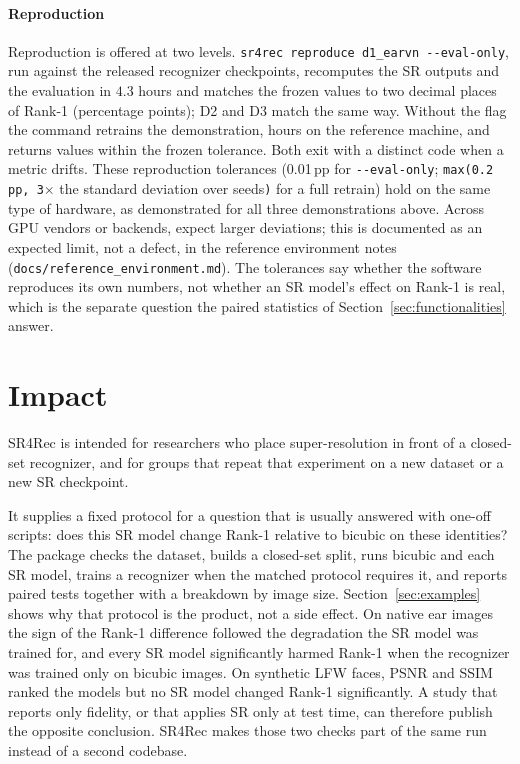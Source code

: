 \documentclass[preprint,12pt]{elsarticle}
\newcommand{\generated}[3]{}
\begin{document}
\generated{tab_latency.tex}{CPU latency, from scripts/make\_paper\_assets.py}{tab:latency}

\paragraph{Reproduction} Reproduction is offered at two levels. \texttt{sr4rec reproduce d1\_earvn
-{}-eval-only}, run against the released recognizer checkpoints, recomputes the SR outputs and the
evaluation in $4.3$ hours and matches the frozen values to two decimal places of Rank-1
(percentage points); D2 and D3 match the same way. Without the flag the command retrains the
demonstration, \DONEHours{} hours on the reference machine, and returns values within the frozen
tolerance. Both exit with a distinct code when a metric drifts. These reproduction tolerances
(0.01\,pp for \texttt{-{}-eval-only}; \texttt{max(0.2\,pp, 3$\times$} the standard deviation over
seeds\texttt{)} for a full retrain) hold on the same type of hardware, as demonstrated for all
three demonstrations above. Across GPU vendors or backends, expect larger deviations; this is
documented as an expected limit, not a defect, in the reference environment notes
(\texttt{docs/reference\_\allowbreak{}environment.md}). The tolerances say
whether the software reproduces its own numbers, not whether an SR model's effect on Rank-1 is
real, which is the separate question the paired statistics of Section~\ref{sec:functionalities}
answer.

\FloatBarrier
\section{Impact}
\label{sec:impact}

SR4Rec is intended for researchers who place super-resolution in front of a closed-set recognizer,
and for groups that repeat that experiment on a new dataset or a new SR checkpoint.

It supplies a fixed protocol for a question that is usually answered with one-off scripts:
does this SR model change Rank-1 relative to bicubic on these identities? The package checks the
dataset, builds a closed-set split, runs bicubic and each SR model, trains a recognizer when the
matched protocol requires it, and reports paired tests together with a breakdown by image size.
Section~\ref{sec:examples} shows why that protocol is the product, not a side effect. On native
ear images the sign of the Rank-1 difference followed the degradation the SR model was trained for,
and every SR model significantly harmed Rank-1 when the recognizer was trained only on bicubic
images. On synthetic LFW faces,
PSNR and SSIM ranked the models but no SR model changed Rank-1 significantly. A study that
reports only fidelity, or that applies SR only at test time, can therefore publish the opposite
conclusion. SR4Rec makes those two checks part of the same run instead of a second codebase.
\end{document}
